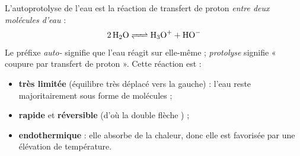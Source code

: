 \documentclass[11pt]{article}
\newcommand{\cle}[1]{{\popxbold\color{popdark}#1}}
\begin{document}
\begin{definition}
L'\cle{autoprotolyse} de l'eau est la réaction de transfert de proton \emph{entre deux molécules d'eau} :
\[ \ce{2 H2O <=> H3O+ + HO-} \]
Le préfixe \emph{auto-} signifie que l'eau réagit sur elle-même ; \emph{protolyse} signifie « coupure par transfert de proton ». Cette réaction est :
\begin{itemize}
\item \textbf{très limitée} (équilibre très déplacé vers la gauche) : l'eau reste majoritairement sous forme de molécules  ;
\item \textbf{rapide} et \textbf{réversible} (d'où la double flèche \ce{<=>}) ;
\item \textbf{endothermique} : elle absorbe de la chaleur, donc elle est favorisée par une élévation de température.
\end{itemize}
\end{definition}
\end{document}
